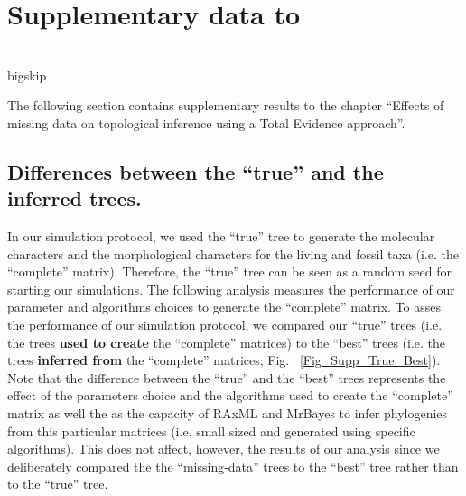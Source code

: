 %
%

\chapter{Supplementary data to }
\label{chap:Appendix_TEM_paper}

\bigskip
\medskip
\begin{center}

 \\
bigskip
\end{center}

The following section contains supplementary results to the chapter ``Effects of missing data on topological inference using a Total Evidence approach''.

\section{Differences between the ``true'' and the inferred trees.}

In our simulation protocol, we used the ``true'' tree to generate the molecular characters and the morphological characters for the living and fossil taxa (i.e. the ``complete'' matrix).
Therefore, the ``true'' tree can be seen as a random seed for starting our simulations.
The following analysis measures the performance of our parameter and algorithms choices to generate the ``complete'' matrix.
To asses the performance of our simulation protocol, we compared our ``true'' trees (i.e. the trees \textbf{used to create} the ``complete'' matrices) to the ``best'' trees (i.e. the trees \textbf{inferred from} the ``complete'' matrices; Fig. ~\ref{Fig_Supp_True_Best}).
Note that the difference between the ``true'' and the ``best'' trees represents the effect of the parameters choice and the algorithms used to create the ``complete'' matrix as well the as the capacity of RAxML and MrBayes to infer phylogenies from this particular matrices (i.e. small sized and generated using specific algorithms).
This does not affect, however, the results of our analysis since we deliberately compared the the ``missing-data'' trees to the ``best'' tree rather than to the ``true'' tree. 

